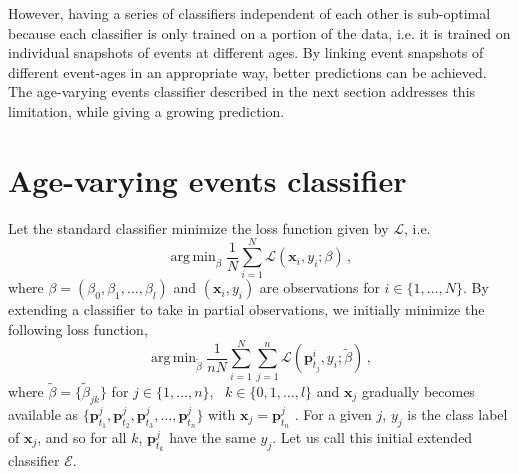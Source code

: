 \documentclass[a4paper,11pt]{article}
\DeclareMathOperator*{\argmin}{arg\,min}
\begin{document}
However, having a series of classifiers independent of each other is sub-optimal because each classifier is only trained on a portion of the data, i.e. it is trained on  individual snapshots of events at different ages. By linking event snapshots of different event-ages in an appropriate way,  better predictions can be achieved.  The age-varying events classifier described in the next section addresses this limitation, while giving a growing prediction.



\section{Age-varying events classifier}\label{sec:ExtendedClassifier}

Let the standard classifier minimize the loss function given by $\mathscr{L}$, i.e.
$$
  \argmin_\beta \frac{1}{N}\sum_{i=1}^N \mathscr{L}(\bm{x}_i,y_i;\beta) \, ,
$$
where $\beta = \left( \beta_0, \beta_1, \dots, \beta_l \right)$ and $(\bm{x}_i, y_i)$ are observations for $i \in \{ 1, \dots, N \}$. By extending a classifier to take in partial observations, we initially minimize the following loss function,
$$
  \argmin_{\tilde{\beta}} \frac{1}{nN} \sum_{i=1}^N \sum_{j=1}^n \mathscr{L} ( \bm{p}^i_{t_j},y_i;\tilde{\beta}) \, ,
$$
where $\tilde{\beta} = \{ \tilde{\beta}_{jk} \}$ for $j \in \{1, \dots, n\}$, \, $k \in \{0, 1, \dots, l \}$ and $\bm{x}_j$ gradually becomes available as $\{\bm{p}^j_{t_1},\bm{p}^j_{t_2}, \bm{p}^j_{t_3}, \dots, \bm{p}^j_{t_n} \}$ with $\bm{x}_j = \bm{p}_{t_n}^j$ . For a given $j$, $y_j$ is the class label of $\bm{x}_j$, and so for all $k$, $\bm{p}^j_{t_k}$ have the same $y_j$. Let us call this initial extended classifier $\mathscr{E}$.
\end{document}
